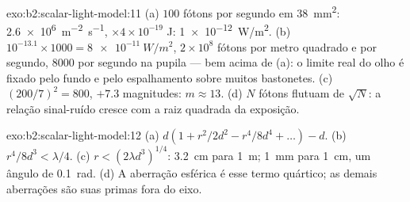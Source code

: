 \begin{solution}{exo:b2:scalar-light-model:11}
(a) $100$ fótons por segundo em \qty{38}{mm^2}: \qty{2.6e6}{m^{-2}.s^{-1}}, $\times4 \times
10^{-19}$ J: \qty{1e-12}{W/m^2}. (b) $10^{-13.1} \times 1000 = \qty{8e-11}{W/m^2}$, $2 \times 10^8$
fótons por metro quadrado e por segundo, $8000$ por segundo na pupila
--- bem acima de (a): o limite real do olho é fixado pelo fundo e pelo
espalhamento sobre muitos bastonetes. (c) $(200/7)^2 = 800$, $+7.3$ magnitudes: $m \approx
13$. (d) $N$ fótons flutuam de $\sqrt N$: a relação sinal-ruído cresce com
a raiz quadrada da exposição.
\end{solution}

\begin{solution}{exo:b2:scalar-light-model:12}
(a) $d(1 + r^2/2d^2 - r^4/8d^4 + \dots) - d$. (b) $r^4/8d^3 < \lambda/4$. (c) $r <
(2\lambda d^3)^{1/4}$: \qty{3.2}{cm} para \qty{1}{m}; \qty{1}{mm} para \qty{1}{cm}, um ângulo de
\qty{0.1}{rad}. (d) A aberração esférica é esse termo quártico; as demais
aberrações são suas primas fora do eixo.
\end{solution}

